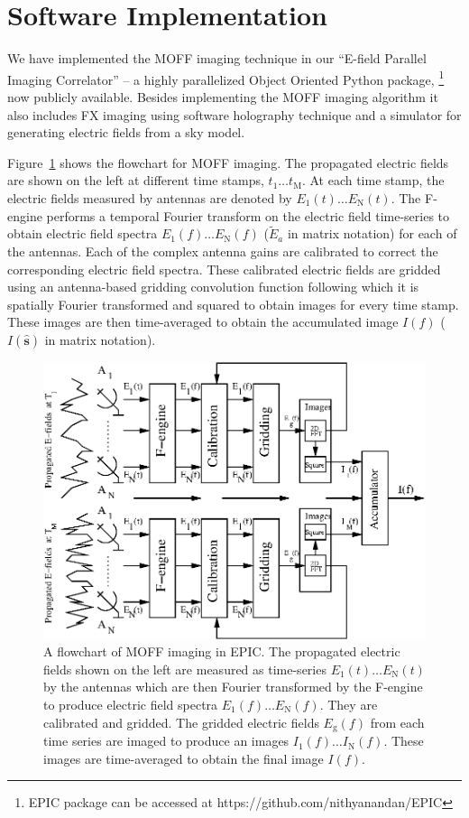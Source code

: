 \documentclass[a4paper,fleqn,usenatbib]{../mnras}
\begin{document}
\section{Software Implementation}\label{sec:software}

We have implemented the MOFF imaging technique in our ``E-field Parallel Imaging
Correlator'' -- a highly parallelized Object Oriented Python package,
\footnote{EPIC package can be accessed at https://github.com/nithyanandan/EPIC}
now publicly available. Besides implementing the MOFF imaging algorithm it also
includes FX imaging using software holography technique and a simulator for
generating electric fields from a sky model. 

Figure~\ref{fig:MOFF-flowchart} shows the flowchart for MOFF imaging. The
propagated electric fields are shown on the left at different time stamps,
$t_1\ldots t_\textrm{M}$. At each time stamp, the electric fields measured by
antennas are denoted by $E_1(t)\ldots E_\textrm{N}(t)$. The F-engine performs a
temporal Fourier transform on the electric field time-series to obtain electric
field spectra $E_1(f)\ldots E_\textrm{N}(f)$ ($\widetilde{E}_a$ in matrix
notation) for each of the antennas. Each of the complex antenna gains are
calibrated to correct the corresponding electric field spectra. These calibrated
electric fields are gridded using an antenna-based gridding convolution function
following which it is spatially Fourier transformed and squared to obtain images
for every time stamp. These images are then time-averaged to obtain the
accumulated image $I(f)$ ($I(\hat{\mathbf{s}})$ in matrix notation).
\begin{figure}
  \includegraphics[width=\columnwidth]{MOFF_flowchart.eps}
  \caption{A flowchart of MOFF imaging in EPIC. The propagated electric fields
    shown on the left are measured as time-series $E_1(t)\ldots E_\textrm{N}(t)$
    by the antennas which are then Fourier transformed by the F-engine to produce
    electric field spectra $E_1(f)\ldots E_\textrm{N}(f)$. They are calibrated and
    gridded. The gridded electric fields $E_\textrm{g}(f)$ from each time series
    are imaged to produce an images $I_1(f)\ldots I_\textrm{N}(f)$. These images
    are time-averaged to obtain the final image $I(f)$.}
  \label{fig:MOFF-flowchart}
\end{figure}
\end{document}
